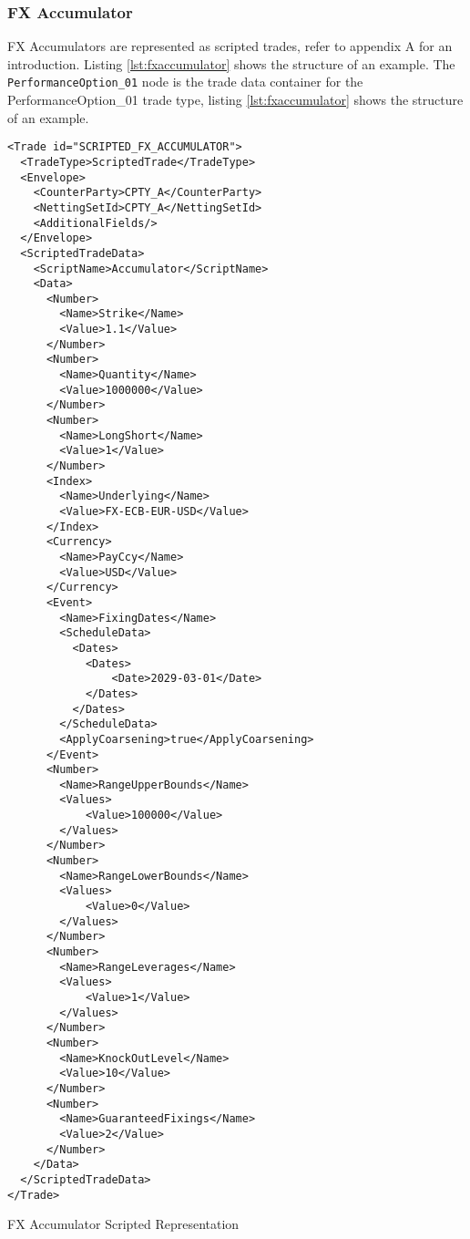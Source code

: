 \subsubsection{FX Accumulator}

FX Accumulators are represented as scripted trades, refer to appendix A for an introduction. Listing \ref{lst:fxaccumulator} shows the structure of an example.
The \verb+PerformanceOption_01+ node is the trade data container for the PerformanceOption\_01 trade type, listing
\ref{lst:fxaccumulator} shows the structure of an example.

\begin{listing}[H]
\begin{verbatim}
<Trade id="SCRIPTED_FX_ACCUMULATOR">
  <TradeType>ScriptedTrade</TradeType>
  <Envelope>
    <CounterParty>CPTY_A</CounterParty>
    <NettingSetId>CPTY_A</NettingSetId>
    <AdditionalFields/>
  </Envelope>
  <ScriptedTradeData>
    <ScriptName>Accumulator</ScriptName>
    <Data>
      <Number>
        <Name>Strike</Name>
        <Value>1.1</Value>
      </Number>
      <Number>
        <Name>Quantity</Name>
        <Value>1000000</Value>
      </Number>
      <Number>
        <Name>LongShort</Name>
        <Value>1</Value>
      </Number>
      <Index>
        <Name>Underlying</Name>
        <Value>FX-ECB-EUR-USD</Value>
      </Index>
      <Currency>
        <Name>PayCcy</Name>
        <Value>USD</Value>
      </Currency>
      <Event>
        <Name>FixingDates</Name>
        <ScheduleData>
          <Dates>
            <Dates>
                <Date>2029-03-01</Date>
            </Dates>
          </Dates>
        </ScheduleData>
        <ApplyCoarsening>true</ApplyCoarsening>
      </Event>
      <Number>
        <Name>RangeUpperBounds</Name>
        <Values>
            <Value>100000</Value>
        </Values>
      </Number>
      <Number>
        <Name>RangeLowerBounds</Name>
        <Values>
            <Value>0</Value>
        </Values>
      </Number>
      <Number>
        <Name>RangeLeverages</Name>
        <Values>
            <Value>1</Value>
        </Values>
      </Number>
      <Number>
        <Name>KnockOutLevel</Name>
        <Value>10</Value>
      </Number>
      <Number>
        <Name>GuaranteedFixings</Name>
        <Value>2</Value>
      </Number>
    </Data>
  </ScriptedTradeData>
</Trade>
\end{verbatim}
\caption{FX Accumulator Scripted Representation}
\label{lst:fxaccumulator}
\end{listing}

